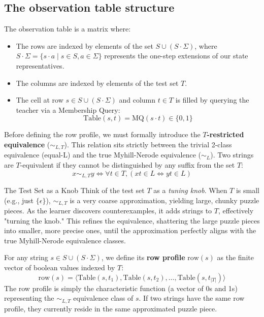 \subsection{The observation table structure}

The observation table is a matrix where:
\begin{itemize}
  \item The rows are indexed by elements of the set $S \cup (S \cdot \Sigma)$, where $S \cdot \Sigma = \{s \cdot a \mid s \in S, a \in \Sigma\}$ represents the one-step extensions of our state representatives.
  \item The columns are indexed by elements of the test set $T$.
  \item The cell at row $s \in S \cup (S \cdot \Sigma)$ and column $t \in T$ is filled by querying the teacher via a Membership Query:
  \[
    \text{Table}(s, t) = \text{MQ}(s \cdot t) \in \{0, 1\}
  \]
\end{itemize}


Before defining the row profile, we must formally introduce the \textbf{$T$-restricted equivalence} ($\sim_{L,T}$). This relation sits strictly between the trivial 2-class equivalence (equal-L) and the true Myhill-Nerode equivalence ($\sim_L$). 
Two strings are $T$-equivalent if they cannot be distinguished by any suffix from the set $T$:
\[
  x \sim_{L,T} y \iff \forall t \in T, (xt \in L \iff yt \in L)
\]

\begin{intermezzo}{The Test Set as a Knob}
Think of the test set $T$ as a \emph{tuning knob}. When $T$ is small (e.g., just $\{\epsilon\}$), $\sim_{L,T}$ is a very coarse approximation, yielding large, chunky puzzle pieces. As the learner discovers counterexamples, it adds strings to $T$, effectively "turning the knob." This refines the equivalence, shattering the large puzzle pieces into smaller, more precise ones, until the approximation perfectly aligns with the true Myhill-Nerode equivalence classes.
\end{intermezzo}

For any string $s \in S \cup (S \cdot \Sigma)$, we define its \textbf{row profile} $\text{row}(s)$ as the finite vector of boolean values indexed by $T$:
\[
  \text{row}(s) = \langle \text{Table}(s, t_1), \text{Table}(s, t_2), \dots, \text{Table}(s, t_{|T|}) \rangle
\]
The row profile is simply the characteristic function (a vector of 0s and 1s) representing the $\sim_{L,T}$ equivalence class of $s$. If two strings have the same row profile, they currently reside in the same approximated puzzle piece.

